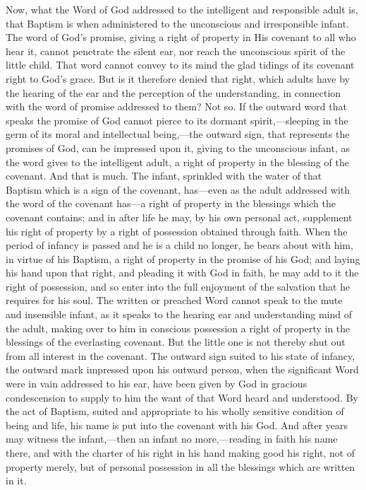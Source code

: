\documentclass[
  english,
]{book}
\begin{document}
Now, what the Word of God addressed to the intelligent and responsible adult is, that Baptism is when administered to the unconscious and irresponsible infant. The word of God's promise, giving a right of property in His covenant to all who hear it, cannot penetrate the silent ear, nor reach the unconscious spirit of the little child. That word cannot convey to its mind the glad tidings of its covenant right to God's grace. But is it therefore denied that right, which adults have by the hearing of the ear and the perception of the understanding, in connection with the word of promise addressed to them? Not so. If the outward word that speaks the promise of God cannot pierce to its dormant spirit,---sleeping in the germ of its moral and intellectual being,---the outward sign, that represents the promises of God, can be impressed upon it, giving to the unconscious infant, as the word gives to the intelligent adult, a right of property in the blessing of the covenant. And that is much. The infant, sprinkled with the water of that Baptism which is a sign of the covenant, has---even as the adult addressed with the word of the covenant has---a right of property in the blessings which the covenant contains; and in after life he may, by his own personal act, supplement his right of property by a right of possession obtained through faith. When the period of infancy is passed and he is a child no longer, he bears about with him, in virtue of his Baptism, a right of property in the promise of his God; and laying his hand upon that right, and pleading it with God in faith, he may add to it the right of possession, and so enter into the full enjoyment of the salvation that he requires for his soul. The written or preached Word cannot speak to the mute and insensible infant, as it speaks to the hearing ear and understanding mind of the adult, making over to him in conscious possession a right of property in the blessings of the everlasting covenant. But the little one is not thereby shut out from all interest in the covenant. The outward sign suited to his state of infancy, the outward mark impressed upon his outward person, when the significant Word were in vain addressed to his ear, have been given by God in gracious condescension to supply to him the want of that Word heard and understood. By the act of Baptism, suited and appropriate to his wholly sensitive condition of being and life, his name is put into the covenant with his God. And after years may witness the infant,---then an infant no more,---reading in faith his name there, and with the charter of his right in his hand making good his right, not of property merely, but of personal possession in all the blessings which are written in it.
\end{document}
